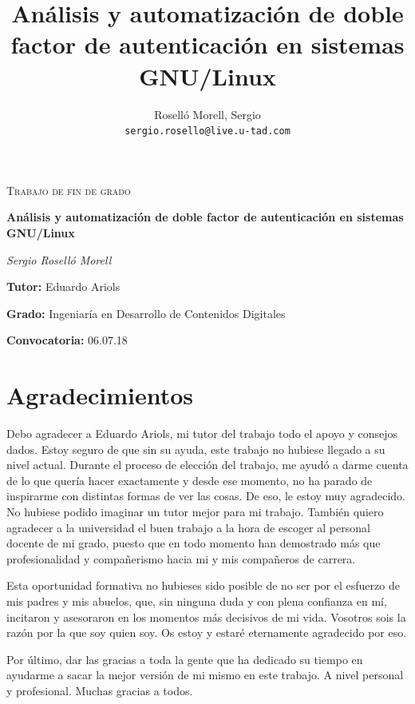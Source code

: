 \documentclass[twoside, titlepage, 12pt, a4paper]{article}
\title{Análisis y automatización de doble factor de autenticación en sistemas GNU/Linux}
\author{Roselló Morell, Sergio\\
\texttt{sergio.rosello@live.u-tad.com}}
\let\oldsection\section
\def\section{\cleardoublepage\oldsection}
\begin{document}
\begin{titlepage}
	\centering
	\begin{figure}
		\centering
		\qquad
	\end{figure}\par\vspace{1cm}
	{\scshape\Large Trabajo de fin de grado\par}
	\vspace{1.5cm}
	{\huge\bfseries Análisis y automatización de doble factor de autenticación en sistemas GNU/Linux\par}
	\vspace{2cm}
	{\Large\itshape Sergio Roselló Morell\par}
	\vfill
	\raggedright
	\textbf{Tutor:} Eduardo Ariols\par
	\textbf{Grado:} Ingeniaría en Desarrollo de Contenidos Digitales\par
	\textbf{Convocatoria:} 06.07.18\par

	\vfill

\end{titlepage}
\section*{Agradecimientos}
Debo agradecer a Eduardo Ariols, mi tutor del trabajo todo el apoyo y consejos dados. Estoy seguro de que sin su ayuda, este trabajo no hubiese llegado a su nivel actual. Durante el proceso de elección del trabajo, me ayudó a darme cuenta de lo que quería hacer exactamente y desde ese momento, no ha parado de inspirarme con distintas formas de ver las cosas. De eso, le estoy muy agradecido. No hubiese podido imaginar un tutor mejor para mi trabajo.
También quiero agradecer a la universidad el buen trabajo a la hora de escoger al personal docente de mi grado, puesto que en todo momento han demostrado más que profesionalidad y compañerismo hacia mi y mis compañeros de carrera.\par
Esta oportunidad formativa no hubieses sido posible de no ser por el esfuerzo de mis padres y mis abuelos, que, sin ninguna duda y con plena confianza en mí, incitaron y asesoraron en los momentos más decisivos de mi vida. Vosotros sois la razón por la que soy quien soy. Os estoy y estaré eternamente agradecido por eso.\par
Por último, dar las gracias a toda la gente que ha dedicado su tiempo en ayudarme a sacar la mejor versión de mi mismo en este trabajo. A nivel personal y profesional. Muchas gracias a todos.
\clearpage
\end{document}

